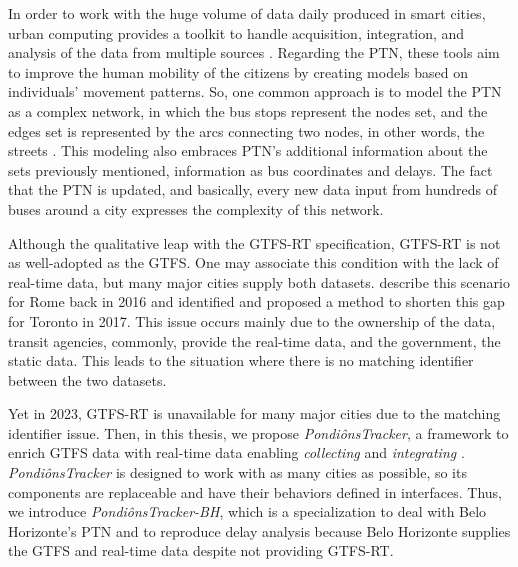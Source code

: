 In order to work with the huge volume of data daily produced in smart cities, 
urban computing provides a toolkit to handle acquisition, integration, and 
analysis of the data from multiple sources \cite{urban_computing}.
Regarding the PTN, these tools aim to improve the human mobility
of the citizens by creating models based on individuals' movement patterns.
So, one common approach is to model the PTN as a complex network, in which 
the bus stops represent the nodes set, and the edges set is represented 
by the arcs connecting two nodes, in other words, the streets \cite{ferber2012}. 
This modeling also embraces PTN's additional information about the
sets previously mentioned, information as bus coordinates and delays.
The fact that the PTN is updated, and basically, every new data input
from hundreds of buses around a city
expresses the complexity of this network.

Although the qualitative leap with the GTFS-RT specification, GTFS-RT
is not as well-adopted as the GTFS. One may associate this condition with
the lack of real-time data, but many major cities supply both datasets.
 describe this scenario for Rome back in 2016
and  identified and proposed a method to 
shorten this gap for Toronto in 2017. This issue occurs mainly due to the 
ownership of the data, transit agencies, commonly, provide the real-time data, and the government, the static data. 
This leads to the situation where there is no matching identifier 
between the two datasets.

Yet in 2023,
GTFS-RT is unavailable for many major cities due 
to the matching identifier issue. Then,
in this thesis, we propose \textit{PondiônsTracker}, a framework
to enrich GTFS data with real-time data enabling { \em collecting } and { \em integrating }. \textit{PondiônsTracker} is designed to work with as many cities as possible, so its components
are replaceable and have their behaviors defined in interfaces. Thus, we
introduce \textit{PondiônsTracker-BH}, which is a specialization to deal with
Belo Horizonte's PTN and to reproduce delay analysis because Belo Horizonte supplies the GTFS and real-time data 
despite not providing GTFS-RT.




